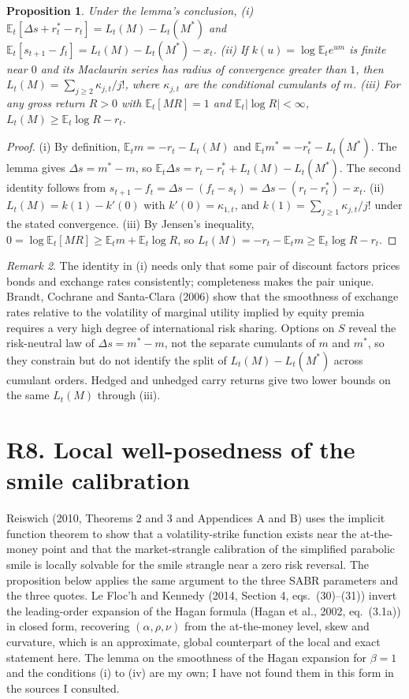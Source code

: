 \documentclass[11pt]{article}
\newtheorem{proposition}{Proposition}
\theoremstyle{remark}
\newtheorem{remark}[proposition]{Remark}
\newcommand{\E}{\mathbb{E}}
\begin{document}
\begin{proposition}
Under the lemma's conclusion, (i) $\E_t[\Delta s+r^*_t-r_t]=L_t(M)-L_t(M^*)$ and $\E_t[s_{t+1}-f_t]=L_t(M)-L_t(M^*)-x_t$. (ii) If $k(u)=\log\E_te^{um}$ is finite near $0$ and its Maclaurin series has radius of convergence greater than $1$, then $L_t(M)=\sum_{j\ge2}\kappa_{j,t}/j!$, where $\kappa_{j,t}$ are the conditional cumulants of $m$. (iii) For any gross return $R>0$ with $\E_t[MR]=1$ and $\E_t|\log R|<\infty$, $L_t(M)\ge\E_t\log R-r_t$.
\end{proposition}

\begin{proof}
(i) By definition, $\E_tm=-r_t-L_t(M)$ and $\E_tm^*=-r^*_t-L_t(M^*)$. The lemma gives $\Delta s=m^*-m$, so $\E_t\Delta s=r_t-r^*_t+L_t(M)-L_t(M^*)$. The second identity follows from $s_{t+1}-f_t=\Delta s-(f_t-s_t)=\Delta s-(r_t-r^*_t)-x_t$. (ii) $L_t(M)=k(1)-k'(0)$ with $k'(0)=\kappa_{1,t}$, and $k(1)=\sum_{j\ge1}\kappa_{j,t}/j!$ under the stated convergence. (iii) By Jensen's inequality, $0=\log\E_t[MR]\ge\E_tm+\E_t\log R$, so $L_t(M)=-r_t-\E_tm\ge\E_t\log R-r_t$.
\end{proof}

\begin{remark}
The identity in (i) needs only that some pair of discount factors prices bonds and exchange rates consistently; completeness makes the pair unique. Brandt, Cochrane and Santa-Clara (2006) show that the smoothness of exchange rates relative to the volatility of marginal utility implied by equity premia requires a very high degree of international risk sharing. Options on $S$ reveal the risk-neutral law of $\Delta s=m^*-m$, not the separate cumulants of $m$ and $m^*$, so they constrain but do not identify the split of $L_t(M)-L_t(M^*)$ across cumulant orders. Hedged and unhedged carry returns give two lower bounds on the same $L_t(M)$ through (iii).
\end{remark}

\section*{R8. Local well-posedness of the smile calibration}

Reiswich (2010, Theorems 2 and 3 and Appendices A and B) uses the implicit function theorem to show that a volatility-strike function exists near the at-the-money point and that the market-strangle calibration of the simplified parabolic smile is locally solvable for the smile strangle near a zero risk reversal. The proposition below applies the same argument to the three SABR parameters and the three quotes. Le Floc'h and Kennedy (2014, Section 4, eqs.~(30)--(31)) invert the leading-order expansion of the Hagan formula (Hagan et al., 2002, eq.~(3.1a)) in closed form, recovering $(\alpha,\rho,\nu)$ from the at-the-money level, skew and curvature, which is an approximate, global counterpart of the local and exact statement here. The lemma on the smoothness of the Hagan expansion for $\beta=1$ and the conditions (i) to (iv) are my own; I have not found them in this form in the sources I consulted.
\end{document}
